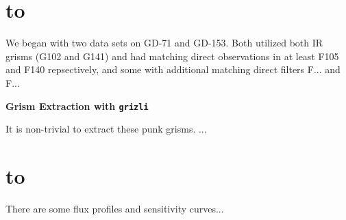 \documentclass[12pt]{article}
\def\ssectionstar#1{\section*{\hbox to \hsize{\large\bf #1\hfill}}}
\begin{document}
{%
\begin{table}[h!]
\caption{\textsl{By comparing the counts in three regions, one entirely made up by an anomaly, 
    one with a small anomaly, and one with just image background, we can quantitatively compare
    the impact of Dragon's Breath on an image.}}
\label{tab:snr_stats}
\end{table}



\ssectionstar{Data}
\normalsize{

We began with two data sets on GD-71 and GD-153. Both utilized both IR grisms (G102 and G141) and had matching direct
observations in at least F105 and F140 repsectively, and some with additional matching direct filters F... and F...



{\bf Grism Extraction with \texttt{grizli}}

It is non-trivial to extract these punk grisms. 
...
}

\ssectionstar{Analysis}
\normalsize{

There are some flux profiles and sensitivity curves...

}


}
\end{document}
